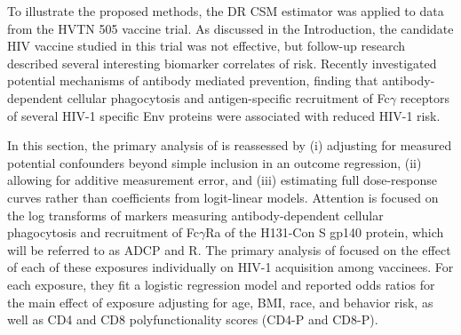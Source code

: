 \documentclass[useAMS,usenatbib,referee]{biom}
\newcommand{\RNum}[1]{\uppercase\expandafter{\romannumeral #1\relax}}
\begin{document}
To illustrate the proposed methods, the DR CSM estimator was applied to data from the HVTN 505 vaccine trial. As discussed in the Introduction, the candidate HIV vaccine studied in this trial was not effective, but follow-up research described several interesting biomarker correlates of risk. Recently \citet{neidich2019} investigated potential mechanisms of antibody mediated prevention, finding that antibody-dependent cellular phagocytosis and antigen-specific recruitment of Fc$\gamma$ receptors of several HIV-1 specific Env proteins were associated with reduced HIV-1 risk.

In this section, the primary analysis of \citet{neidich2019} is reassessed by (i) adjusting for measured potential confounders beyond simple inclusion in an outcome regression, (ii) allowing for additive measurement error, and (iii) estimating full dose-response curves rather than coefficients from logit-linear models. Attention is focused on the log transforms of markers measuring antibody-dependent cellular phagocytosis and recruitment of Fc$\gamma$R\RNum{2}a of the H131-Con S gp140 protein, which will be referred to as ADCP and R\RNum{2}. The primary analysis of \citet{neidich2019} focused on the effect of each of these exposures individually on HIV-1 acquisition among vaccinees. For each exposure, they fit a logistic regression model and reported odds ratios for the main effect of exposure adjusting for age, BMI, race, and behavior risk, as well as CD4 and CD8 polyfunctionality scores (CD4-P and CD8-P).
\end{document}
